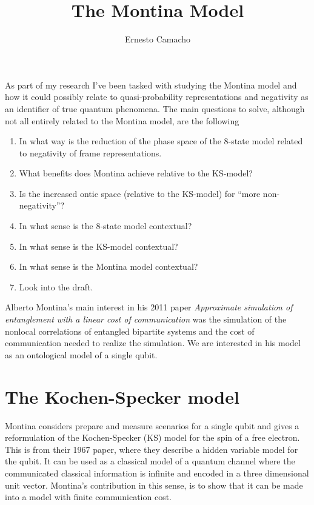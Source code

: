 \documentclass[12pt,draft]{article}
\title{The Montina Model}
\author{Ernesto Camacho}
\theoremstyle{definition}
\theoremstyle{plain}
\begin{document}
    \maketitle

    As part of my research I've been tasked with studying
    the Montina model and how it could possibly relate to
    quasi-probability representations and negativity as an
    identifier of true quantum phenomena. The main questions
    to solve, although not all entirely related to the
    Montina model, are the following
    \begin{enumerate}
        \item In what way is the reduction of the phase
            space of the 8-state model related to negativity
            of frame representations.
        \item What benefits does Montina achieve relative to
            the KS-model?
        \item Is the increased ontic space (relative to the
            KS-model) for ``more non-negativity''?
        \item In what sense is the 8-state model contextual?
        \item In what sense is the KS-model contextual?
        \item In what sense is the Montina model contextual?
        \item Look into the draft.
    \end{enumerate}

    Alberto Montina's main interest in his 2011 paper
    \textit{Approximate simulation of entanglement with a
    linear cost of communication} was the simulation of the
    nonlocal correlations of entangled bipartite systems and
    the cost of communication needed to realize the
    simulation. We are interested in his model as an
    ontological model of a single qubit.

    \section{The Kochen-Specker model}

    Montina considers prepare and measure scenarios for a
    single qubit and gives a reformulation of the
    Kochen-Specker (KS) model for the spin of a free
    electron. This is from their 1967 paper, where they
    describe a hidden variable model for the qubit.  It can
    be used as a classical model of a quantum channel where
    the communicated classical information is infinite and
    encoded in a three dimensional unit vector.  Montina's
    contribution in this sense, is to show that it can be
    made into a model with finite communication cost.
\end{document}
